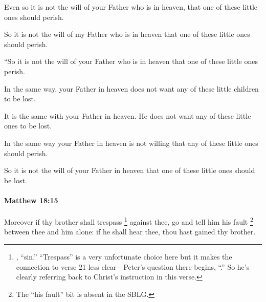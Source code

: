 			\begin{framed}
			\scriptsize
				\begin{compactdesc}
					\item[SBLG] 
					\item[ASV] Even so it is not the will of your Father who is in heaven, that one of these little ones should perish.
					\item[ESV] So it is not the will of my Father who is in heaven that one of these little ones should perish.
					\item[NASB] ``So it is not the will of your Father who is in heaven that one of these little ones perish.
					\item[NCV] In the same way, your Father in heaven does not want any of these little children to be lost.
					\item[NIRV] It is the same with your Father in heaven. He does not want any of these little ones to be lost.
					\item[NIV] In the same way your Father in heaven is not willing that any of these little ones should perish.
					\item[NRSV] So it is not the will of your Father in heaven that one of these little ones should be lost.
				\end{compactdesc}
			\end{framed}

		\paragraph{Matthew 18:15} %
			\label{MATTHEW-18-15}

			Moreover if thy brother shall trespass%
				\footnote{%
					, ``sin.'' ``Trespass'' is a very unfortunate choice here but it makes the connection to verse 21 less clear---Peter's question there begins, ``.'' So he's clearly referring back to Christ's instruction in this verse.
					}
			against thee, go and tell him his fault%
				\footnote{%
					The ``his fault'' bit is absent in the SBLG.
					}
			between thee and him alone: if he shall hear thee, thou hast gained thy brother.

